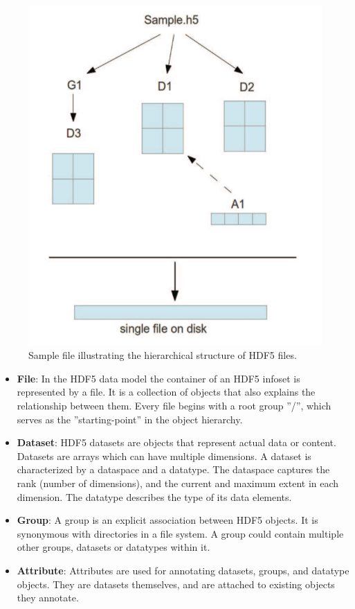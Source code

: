\documentclass[conference]{IEEEtran}
\begin{document}
\begin{figure}[htbp]
\centering
\includegraphics[scale=0.30]{images/hdf5.png}
\caption{Sample file illustrating the hierarchical structure of HDF5
files. \label{hdf5-sample}}
\end{figure}

\begin{itemize}
\item
  \textbf{File}: In the HDF5 data model the container of an HDF5 infoset
  is represented by a file. It is a collection of objects that also
  explains the relationship between them. Every file begins with a root
  group ''/'', which serves as the ''starting-point'' in the object
  hierarchy.
\item
  \textbf{Dataset}: HDF5 datasets are objects that represent actual data
  or content. Datasets are arrays which can have multiple dimensions. A
  dataset is characterized by a dataspace and a datatype. The dataspace
  captures the rank (number of dimensions), and the current and maximum
  extent in each dimension. The datatype describes the type of its data
  elements.
\item
  \textbf{Group}: A group is an explicit association between HDF5
  objects. It is synonymous with directories in a file system. A group
  could contain multiple other groups, datasets or datatypes within it.
\item
  \textbf{Attribute}: Attributes are used for annotating datasets,
  groups, and datatype objects. They are datasets themselves, and are
  attached to existing objects they annotate.
\end{itemize}
\end{document}
